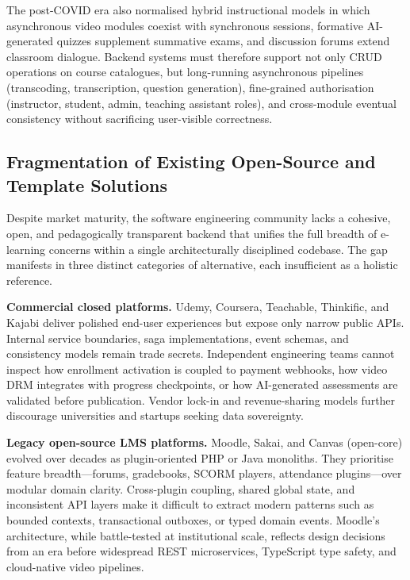 The post-COVID era also normalised hybrid instructional models in which asynchronous video modules coexist with synchronous sessions, formative AI-generated quizzes supplement summative exams, and discussion forums extend classroom dialogue. Backend systems must therefore support not only CRUD operations on course catalogues, but long-running asynchronous pipelines (transcoding, transcription, question generation), fine-grained authorisation (instructor, student, admin, teaching assistant roles), and cross-module eventual consistency without sacrificing user-visible correctness.

\subsection{Fragmentation of Existing Open-Source and Template Solutions}
\label{subsec:fragmentation}

Despite market maturity, the software engineering community lacks a cohesive, open, and pedagogically transparent backend that unifies the full breadth of e-learning concerns within a single architecturally disciplined codebase. The gap manifests in three distinct categories of alternative, each insufficient as a holistic reference.

\textbf{Commercial closed platforms.} Udemy, Coursera, Teachable, Thinkific, and Kajabi deliver polished end-user experiences but expose only narrow public APIs. Internal service boundaries, saga implementations, event schemas, and consistency models remain trade secrets. Independent engineering teams cannot inspect how enrollment activation is coupled to payment webhooks, how video DRM integrates with progress checkpoints, or how AI-generated assessments are validated before publication. Vendor lock-in and revenue-sharing models further discourage universities and startups seeking data sovereignty.

\textbf{Legacy open-source LMS platforms.} Moodle, Sakai, and Canvas (open-core) evolved over decades as plugin-oriented PHP or Java monoliths. They prioritise feature breadth---forums, gradebooks, SCORM players, attendance plugins---over modular domain clarity. Cross-plugin coupling, shared global state, and inconsistent API layers make it difficult to extract modern patterns such as bounded contexts, transactional outboxes, or typed domain events. Moodle's architecture, while battle-tested at institutional scale, reflects design decisions from an era before widespread REST microservices, TypeScript type safety, and cloud-native video pipelines.

